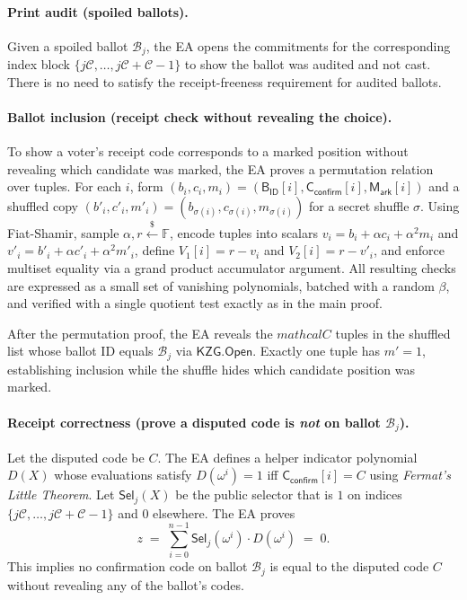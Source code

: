 \paragraph{Print audit (spoiled ballots).}
Given a spoiled ballot $\mathcal{B}_j$, the EA opens the commitments for the corresponding index block $\{j\mathcal{C},\dots,j\mathcal{C}+\mathcal{C}-1\}$ to show the ballot was audited and not cast.
There is no need to satisfy the receipt-freeness requirement for audited ballots.

\paragraph{Ballot inclusion (receipt check without revealing the choice).}
To show a voter’s receipt code corresponds to a marked position without revealing which candidate was marked, the EA proves a permutation relation over tuples.
For each $i$, form $(b_i,c_i,m_i)=(\mathsf{B_{ID}}[i],\mathsf{C}_{\mathsf{confirm}}[i],\mathsf{M_{ark}}[i])$ and a shuffled copy
$(b'_i,c'_i,m'_i)=(b_{\sigma(i)},c_{\sigma(i)},m_{\sigma(i)})$ for a secret shuffle $\sigma$.
Using Fiat-Shamir, sample $\alpha,r\stackrel{\$}{\leftarrow} \mathbb{F}$, encode tuples into scalars
$v_i=b_i+\alpha c_i+\alpha^2 m_i$ and $v'_i=b'_i+\alpha c'_i+\alpha^2 m'_i$, define
$V_1[i]=r-v_i$ and $V_2[i]=r-v'_i$, and enforce multiset equality via a grand product accumulator argument.
All resulting checks are expressed as a small set of vanishing polynomials, batched with
a random $\beta$, and verified with a single quotient test exactly as in the main proof.  

After the permutation proof, the EA reveals the $mathcal{C}$ tuples in the shuffled list whose ballot ID equals $\mathcal{B}_j$ via $\mathsf{KZG.Open}$.
Exactly one tuple has $m'=1$, establishing inclusion while the shuffle hides which candidate position was marked.

\paragraph{Receipt correctness (prove a disputed code is \emph{not} on ballot $\mathcal{B}_j$).}
Let the disputed code be $C$. The EA defines a helper indicator polynomial $D(X)$ whose evaluations satisfy
$D(\omega^i)=1$ iff $\mathsf{C}_{\mathsf{confirm}}[i]=C$ using \emph{Fermat's Little Theorem}.
Let $\mathsf{Sel}_j(X)$ be the public selector that is $1$ on indices $\{j\mathcal{C},\dots,j\mathcal{C}+\mathcal{C}-1\}$ and $0$ elsewhere.
The EA proves
\[
z \;=\; \sum_{i=0}^{n-1}\mathsf{Sel}_j(\omega^i)\cdot D(\omega^i) \;=\; 0.
\]
This implies no confirmation code on ballot $\mathcal{B}_j$ is equal to the disputed code $C$ without revealing any of the ballot’s codes.

